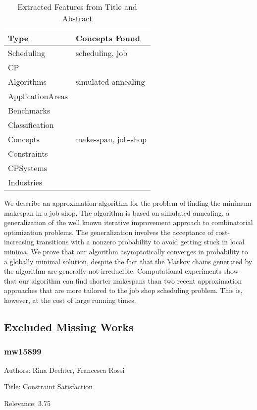 {\scriptsize
\begin{longtable}{p{2cm}p{20cm}}
\caption{Extracted Features from Title and Abstract}\\ \toprule
Type & Concepts Found\\ \midrule
\endhead
\bottomrule
\endfoot
Scheduling & scheduling, job\\ 
CP & \\ 
Algorithms & simulated annealing\\ 
ApplicationAreas & \\ 
Benchmarks & \\ 
Classification & \\ 
Concepts & make-span, job-shop\\ 
Constraints & \\ 
CPSystems & \\ 
Industries & \\ 
\end{longtable}
}

  We describe an approximation algorithm for the problem of finding the minimum makespan in a job shop. The algorithm is based on simulated annealing, a generalization of the well known iterative improvement approach to combinatorial optimization problems. The generalization involves the acceptance of cost-increasing transitions with a nonzero probability to avoid getting stuck in local minima. We prove that our algorithm asymptotically converges in probability to a globally minimal solution, despite the fact that the Markov chains generated by the algorithm are generally not irreducible. Computational experiments show that our algorithm can find shorter makespans than two recent approximation approaches that are more tailored to the job shop scheduling problem. This is, however, at the cost of large running times.  

\subsection{Excluded Missing Works}

\subsubsection{mw15899}
\label{mw:mw15899}

Authors: Rina Dechter, Francesca Rossi

Title: Constraint Satisfaction

Relevance:  3.75


